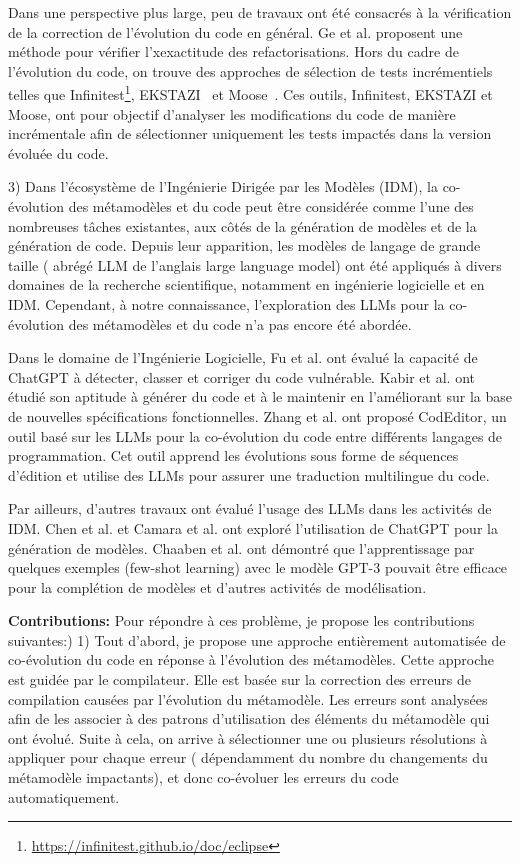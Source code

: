 Dans une perspective plus large, peu de travaux ont été consacrés à la vérification de la correction de l’évolution du code en général.
Ge et al. \cite{10.1145/2568225.2568280} proposent une méthode pour vérifier l'xexactitude des refactorisations. Hors du cadre de l’évolution du code, on trouve des approches de sélection de tests incrémentiels telles que Infinitest\footnote{\url{https://infinitest.github.io/doc/eclipse}}, EKSTAZI~\cite{7203050} et Moose~\cite{ducasse2000moose}. Ces outils, Infinitest, EKSTAZI et Moose, ont pour objectif d'analyser les modifications du code de manière incrémentale afin de sélectionner uniquement les tests impactés dans la version évoluée du code.

3) Dans l’écosystème de l’Ingénierie Dirigée par les Modèles (IDM), la co-évolution des métamodèles et du code peut être considérée comme l’une des nombreuses tâches existantes, aux côtés de la génération de modèles et de la génération de code. Depuis leur apparition, les modèles de langage de grande taille ( abrégé LLM de l'anglais large language model) ont été appliqués à divers domaines de la recherche scientifique, notamment en ingénierie logicielle et en IDM. Cependant, à notre connaissance, l’exploration des LLMs pour la co-évolution des métamodèles et du code n’a pas encore été abordée.

Dans le domaine de l’Ingénierie Logicielle, Fu et al. \cite{fu2023chatgpt} ont évalué la capacité de ChatGPT à détecter, classer et corriger du code vulnérable. Kabir et al. \cite{kabir2023empirical} ont étudié son aptitude à générer du code et à le maintenir en l’améliorant sur la base de nouvelles spécifications fonctionnelles. Zhang et al. \cite{zhang2023multilingual} ont proposé CodEditor, un outil basé sur les LLMs pour la co-évolution du code entre différents langages de programmation. Cet outil apprend les évolutions sous forme de séquences d’édition et utilise des LLMs pour assurer une traduction multilingue du code.

Par ailleurs, d’autres travaux ont évalué l’usage des LLMs dans les activités de IDM. Chen et al. \cite{10344012} et Camara et al. \cite{camara2023assessment} ont exploré l’utilisation de ChatGPT pour la génération de modèles. Chaaben et al. \cite{chaaben2023towards} ont démontré que l’apprentissage par quelques exemples (few-shot learning) avec le modèle GPT-3 pouvait être efficace pour la complétion de modèles et d’autres activités de modélisation.

\textbf{Contributions:} Pour répondre à ces problème, je propose les contributions suivantes:\right) 
1) Tout d’abord, je propose une approche entièrement automatisée de co-évolution du code en réponse à l’évolution des métamodèles. Cette approche est guidée par le compilateur. Elle est basée sur la correction des erreurs de compilation causées par l'évolution du métamodèle. Les erreurs sont analysées afin de les associer à des patrons d'utilisation des éléments du métamodèle qui ont évolué. Suite à cela, on arrive à sélectionner une ou plusieurs résolutions à appliquer pour chaque erreur ( dépendamment du nombre du changements du métamodèle impactants), et donc co-évoluer les erreurs du code automatiquement. 

